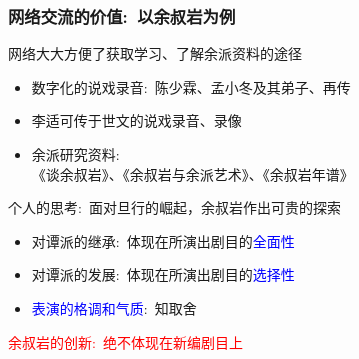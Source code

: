 \documentclass[cjk,slidestop,compress,mathserif,blue]{beamer}
\begin{document}
\frame
{
	\frametitle{网络交流的价值:~以余叔岩为例}
网络大大方便了获取学习、了解余派资料的途径
\begin{itemize}
	\item 数字化的说戏录音:~陈少霖、孟小冬及其弟子、再传
	\item 李适可传于世文的说戏录音、录像
	\item 余派研究资料:\\
		《谈余叔岩》、《余叔岩与余派艺术》、《余叔岩年谱》
\end{itemize}
\vskip 3pt
个人的思考:~面对旦行的崛起，余叔岩作出可贵的探索
\begin{itemize}
	\item 对谭派的继承:~体现在所演出剧目的\textcolor{blue}{全面性}
	\item 对谭派的发展:~体现在所演出剧目的\textcolor{blue}{选择性}
	\item \textcolor{blue}{表演的格调和气质}:~知取舍
\end{itemize}
\vskip 5pt
\textcolor{red}{余叔岩的创新:~绝不体现在新编剧目上}
}







\end{document}
